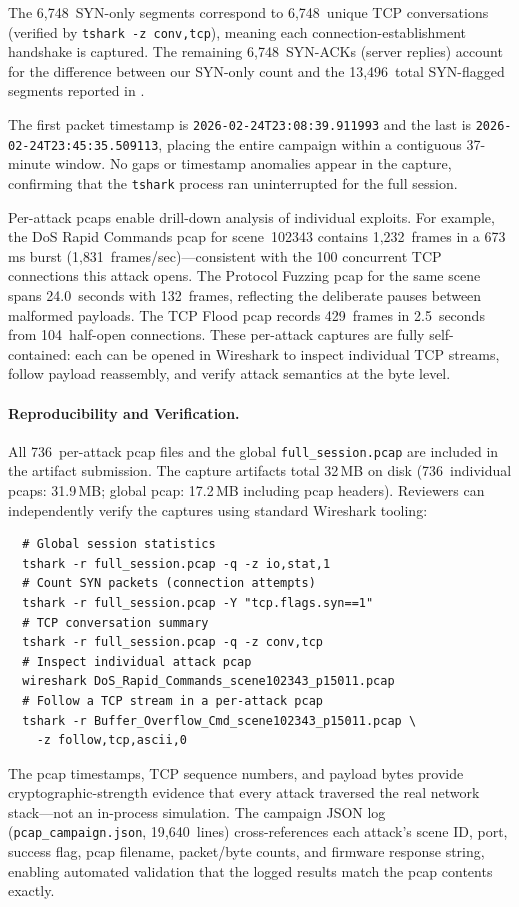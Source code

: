 \noindent
The 6{,}748~SYN-only segments correspond to 6{,}748~unique TCP
conversations (verified by \texttt{tshark~-z~conv,tcp}), meaning
each connection-establishment handshake is captured.  The remaining
6{,}748~SYN-ACKs (server replies) account for the difference between
our SYN-only count and the 13{,}496~total SYN-flagged segments
reported in .

The first packet timestamp is
\texttt{2026-02-24T23:08:39.911993} and the last is
\texttt{2026-02-24T23:45:35.509113}, placing the entire campaign
within a contiguous 37-minute window.  No gaps or timestamp
anomalies appear in the capture, confirming that the
\texttt{tshark} process ran uninterrupted for the full session.

Per-attack pcaps enable drill-down analysis of individual
exploits.  For example, the DoS Rapid Commands pcap for
scene~102343 contains 1{,}232~frames in a 673\,ms burst
(1{,}831~frames/sec)---consistent with the 100 concurrent TCP
connections this attack opens.  The Protocol Fuzzing pcap for the
same scene spans 24.0~seconds with 132~frames, reflecting the
deliberate pauses between malformed payloads.  The TCP Flood pcap
records 429~frames in 2.5~seconds from 104~half-open connections.
These per-attack captures are fully self-contained: each can be
opened in Wireshark to inspect individual TCP streams, follow
payload reassembly, and verify attack semantics at the byte level.

\paragraph{Reproducibility and Verification.}
All 736~per-attack pcap files and the global
\texttt{full\_session.pcap} are included in the artifact
submission.  The capture artifacts total 32\,MB on disk
(736~individual pcaps: 31.9\,MB; global pcap: 17.2\,MB
including pcap headers).  Reviewers can independently verify the
captures using standard Wireshark tooling:
\begin{verbatim}
  # Global session statistics
  tshark -r full_session.pcap -q -z io,stat,1
  # Count SYN packets (connection attempts)
  tshark -r full_session.pcap -Y "tcp.flags.syn==1"
  # TCP conversation summary
  tshark -r full_session.pcap -q -z conv,tcp
  # Inspect individual attack pcap
  wireshark DoS_Rapid_Commands_scene102343_p15011.pcap
  # Follow a TCP stream in a per-attack pcap
  tshark -r Buffer_Overflow_Cmd_scene102343_p15011.pcap \
    -z follow,tcp,ascii,0
\end{verbatim}
The pcap timestamps, TCP sequence numbers, and payload bytes
provide cryptographic-strength evidence that every attack traversed
the real network stack---not an in-process simulation.
The campaign JSON log (\texttt{pcap\_campaign.json}, 19{,}640~lines)
cross-references each attack's scene ID, port, success flag, pcap
filename, packet/byte counts, and firmware response string, enabling
automated validation that the logged results match the pcap
contents exactly.

